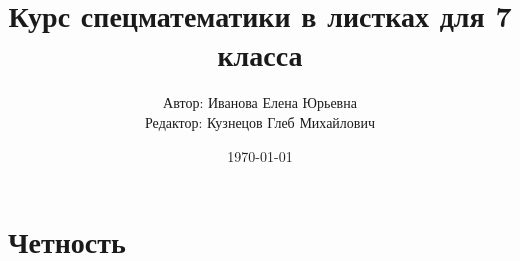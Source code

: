 \documentclass[11pt,a4paper]{report}
\title{Курс спецматематики в листках для 7 класса}
\author{Автор: Иванова Елена Юрьевна\\
	Редактор: Кузнецов Глеб Михайлович}
\date{\today}
\theoremstyle{myrmk}
\theoremstyle{mypln}
\theoremstyle{mydfn}
\begin{document}
		\maketitle
		\tableofcontents
		\newpage

\chapter{Четность}









%
%
%
%
%
%
%
\end{document}
